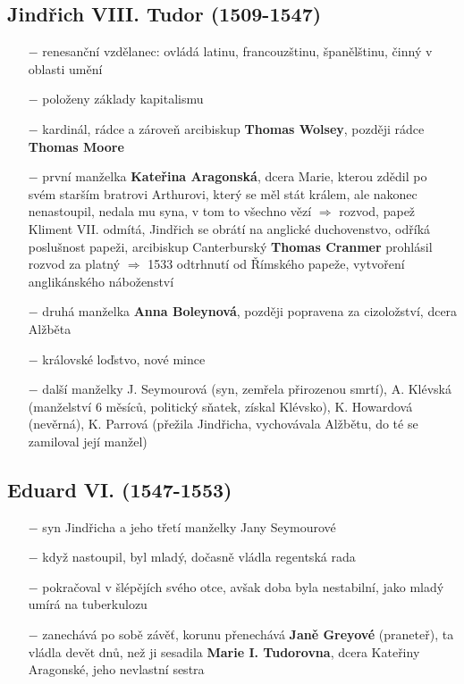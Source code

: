 \documentclass{article}
\begin{document}
\subsection*{Jindřich VIII. Tudor (1509-1547)}
\begin{itemize}
    \vspace{-0.5em}
    \setlength\itemsep{0.15em}
    \item[$-$] renesanční vzdělanec: ovládá latinu, francouzštinu, španělštinu, činný v oblasti umění
    \item[$-$] položeny základy kapitalismu
    \item[$-$] kardinál, rádce a zároveň arcibiskup \textbf{Thomas Wolsey}, později rádce \textbf{Thomas Moore}
    \item[$-$] první manželka \textbf{Kateřina Aragonská}, dcera Marie, kterou zdědil po svém starším bratrovi Arthurovi, který se měl stát králem, ale nakonec nenastoupil, nedala mu syna, v tom to všechno vězí $\Rightarrow$ rozvod, papež Kliment VII. odmítá, Jindřich se obrátí na anglické duchovenstvo, odříká poslušnost papeži, arcibiskup Canterburský \textbf{Thomas Cranmer} prohlásil rozvod za platný $\Rightarrow$ 1533 odtrhnutí od Římského papeže, vytvoření anglikánského náboženství
    \item[$-$] druhá manželka \textbf{Anna Boleynová}, později popravena za cizoložství, dcera Alžběta
    \item[$-$] královské loďstvo, nové mince
    \item[$-$] další manželky J. Seymourová (syn, zemřela přirozenou smrtí), A. Klévská (manželství 6 měsíců, politický sňatek, získal Klévsko), K. Howardová (nevěrná), K. Parrová (přežila Jindřicha, vychovávala Alžbětu, do té se zamiloval její manžel)
\end{itemize}

\subsection*{Eduard VI. (1547-1553)}
\begin{itemize}
    \vspace{-0.5em}
    \setlength\itemsep{0.15em}
    \item[$-$] syn Jindřicha a jeho třetí manželky Jany Seymourové
    \item[$-$] když nastoupil, byl mladý, dočasně vládla regentská rada
    \item[$-$] pokračoval v šlépějích svého otce, avšak doba byla nestabilní, jako mladý umírá na tuberkulozu
    \item[$-$] zanechává po sobě závěť, korunu přenechává \textbf{Janě Greyové} (praneteř), ta vládla devět dnů, než ji sesadila \textbf{Marie I. Tudorovna}, dcera Kateřiny Aragonské, jeho nevlastní sestra

\end{itemize}
\end{document}
